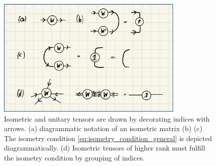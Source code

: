 \begin{figure}
	\centering
	\includegraphics[width=0.8\textwidth]{figures/Tensor_Networks/basic_isometric_tensor_diagrams.jpeg}
	\caption{Isometric and unitary tensors are drawn by decorating indices with arrows. (a) diagrammatic notation of an isometric matrix (b) (c) The isometry condition \eqref{eq:isometry_condition_general} is depicted diagrammatically. (d) Isometric tensors of higher rank must fulfill the isometry condition by grouping of indices.}
	\label{fig:isometries_and_unitaries_diagrams}
\end{figure}